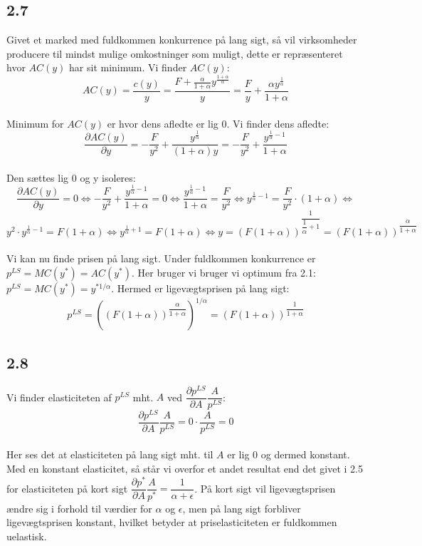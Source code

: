 \documentclass[a4paper, 12pt]{article}
\begin{document}
\subsection*{2.7}
Givet et marked med fuldkommen konkurrence på lang sigt, så vil virksomheder producere til mindst mulige omkostninger som muligt, dette er repræsenteret hvor $AC(y)$ har sit minimum. Vi finder $AC(y)$:
$$AC(y) = \frac{c(y)}{y} = \dfrac{F + \frac{\alpha}{1 + \alpha} y^{\frac{1+ \alpha}{\alpha}}}{y} = \dfrac{F}{y} + \dfrac{\alpha y^{\frac{1}{\alpha}}}{1+ \alpha}$$
\\
Minimum for $AC(y)$ er  hvor dens afledte er lig $0$. Vi finder dens afledte:
$$\dfrac{\partial AC(y)}{\partial y} = -  \dfrac{F}{y^{2}} + \dfrac{ y^{\frac{1}{\alpha}}}{(1+ \alpha) y} = -  \dfrac{F}{y^{2}} + \dfrac{y^{\frac{1}{\alpha}-1}}{1 + \alpha} $$
\\
Den sættes lig $0$ og y isoleres:
$$ \dfrac{\partial AC(y)}{\partial y} = 0 \Leftrightarrow  -  \dfrac{F}{y^{2}} + \dfrac{y^{\frac{1}{\alpha}-1}}{1 + \alpha} = 0 \Leftrightarrow \dfrac{y^{\frac{1}{\alpha}-1}}{1 + \alpha} = \dfrac{F}{y^{2}} \Leftrightarrow y^{\frac{1}{\alpha} - 1} = \dfrac{F}{y^{2}} \cdot (1+\alpha) \Leftrightarrow$$
$$ y^{2}\cdot y^{\frac{1}{\alpha} - 1}  = F(1 + \alpha) \Leftrightarrow y^{\frac{1}{\alpha}+1} = F(1 + \alpha) \Leftrightarrow y = (F(1 + \alpha) )^{\dfrac{1}{\dfrac{1}{\alpha} +1}} = (F(1 + \alpha) )^{\dfrac{\alpha}{1 + \alpha}}$$
\\
Vi kan nu finde prisen på lang sigt. Under fuldkommen konkurrence er $p^{LS} = MC(y^{*}) = AC(y^{*})$. Her bruger vi bruger vi optimum fra 2.1: $p^{LS} = MC(y^{*}) = y^{* 1/ \alpha}$. Hermed er ligevægtsprisen på lang sigt:
$$p^{LS} = \left(  (F(1 + \alpha) )^{\dfrac{\alpha}{1 + \alpha}} \right)^{1 / \alpha} =  (F(1 + \alpha) )^{\dfrac{1}{1 + \alpha}}$$

\subsection*{2.8}
Vi finder elasticiteten af $p^{LS}$ mht. $A$ ved $\dfrac{\partial p^{LS}}{\partial A} \dfrac{A}{p^{LS}}$:
$$\dfrac{\partial p^{LS}}{\partial A} \dfrac{A}{p^{LS}} = 0 \cdot \dfrac{A}{p^{LS}} = 0$$
\\
Her ses det at elasticiteten på lang sigt mht. til $A$ er lig $0$ og dermed konstant. Med en konstant elasticitet, så står vi overfor et andet resultat end det givet i 2.5 for elasticiteten på kort sigt $\dfrac{\partial p^{*}}{\partial A}\dfrac{A}{p^{*}} = \dfrac{1}{\alpha + \epsilon}$. På kort sigt vil ligevægtsprisen ændre sig i forhold til værdier for $\alpha$ og $\epsilon$, men på lang sigt forbliver ligevægtsprisen konstant, hvilket betyder at priselasticiteten er fuldkommen uelastisk.
\end{document}
